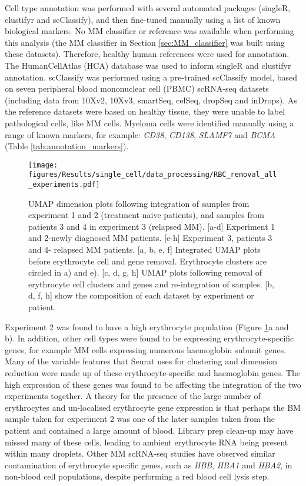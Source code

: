 Cell type annotation was performed with several automated packages (singleR, clustifyr and scClassify), and then fine-tuned manually using a list of known biological markers.
No MM classifier or reference was available when performing this analysis (the MM classifier in Section \ref{sec:MM_classifier} was built using these datasets).
Therefore, healthy human references were used for annotation.
The HumanCellAtlas (HCA) database was used to inform singleR and clustifyr annotation.
scClassify was performed using a pre-trained scClassify model, based on seven peripheral blood mononuclear cell (PBMC) scRNA-seq datasets (including data from 10Xv2, 10Xv3, smartSeq, celSeq, dropSeq and inDrops).
As the reference datasets were based on healthy tissue, they were unable to label pathological cells, like MM cells.
Myeloma cells were identified manually using a range of known markers, for example: \textit{CD38}, \textit{CD138}, \textit{SLAMF7} and \textit{BCMA} (Table \ref{tab:annotation_markers}).

\begin{figure}[htb]
    \centering
    \texttt{[image: figures/Results/single\_cell/data\_processing/RBC\_removal\_all\_experiments.pdf]}
    \caption[Erythrocyte removal from integrated scRNA-seq datasets]{UMAP dimension plots following integration of samples from experiment 1 and 2 (treatment naive patients), and samples from patients 3 and 4 in experiment 3 (relapsed MM).
    [a-d] Experiment 1 and 2-newly diagnosed MM patients.
    [e-h] Experiment 3, patients 3 and 4- relapsed MM patients.
     [a, b, e, f] Integrated UMAP plots before erythrocyte cell and gene removal. Erythrocyte clusters are circled in a) and e).
     [c, d, g, h] UMAP plots following removal of erythrocyte cell clusters and genes and re-integration of samples.
     [b, d, f, h] show the composition of each dataset by experiment or patient.}
    \label{fig:umap_RBC}
\end{figure}

Experiment 2 was found to have a high erythrocyte population (Figure \ref{fig:umap_RBC}a and b).
In addition, other cell types were found to be expressing erythrocyte-specific genes, for example MM cells expressing numerous haemoglobin subunit genes.
Many of the variable features that Seurat uses for clustering and dimension reduction were made up of these erythrocyte-specific and haemoglobin genes.
The high expression of these genes was found to be affecting the integration of the two experiments together.
A theory for the presence of the large number of erythrocytes and un-localised erythrocyte gene expression is that perhaps the BM sample taken for experiment 2 was one of the later samples taken from the patient and contained a large amount of blood.
Library prep clean-up may have missed many of these cells, leading to ambient erythrocyte RNA being present within many droplets.
Other MM scRNA-seq studies have observed similar contamination of erythrocyte specific genes, such as \textit{HBB}, \textit{HBA1} and \textit{HBA2}, in non-blood cell populations, despite performing a red blood cell lysis step\cite{chen2021cryopreservation}.

